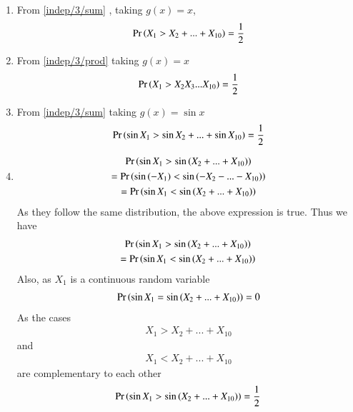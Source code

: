 \begin{enumerate}[label = (\Alph*)]
    \item 
    From \eqref{indep/3/sum} , taking $g(x)=x$,
    \begin{align}
        \Pr\left(X_1>X_2+...+X_{10}\right)=\frac{1}{2}
    \end{align}
\item
From \eqref{indep/3/prod} taking $g(x)=x$
        \begin{align}
         \Pr\left(X_1>X_2X_3...X_{10}\right)=\frac{1}{2}   
        \end{align}
\item 
From \eqref{indep/3/sum} taking $g(x)=\sin{x}$
        \begin{align}
         \Pr\left(\sin{X_1}>\sin{X_2}+...+\sin{X_{10}}\right)=\frac{1}{2}   
        \end{align}
\item \begin{multline}
        \Pr\left(\sin{X_1}>\sin{(X_2+...+X_{10})}\right)\\=\Pr\left(\sin{(-X_1)}<\sin{(-X_2-...-X_{10})}\right)\\
        =\Pr\left(\sin{X_1}<\sin{(X_2+...+X_{10})}\right)
    \end{multline}
    As they follow the same distribution, the above expression is true.
    Thus we have
    \begin{multline} 
    \Pr\left(\sin{X_1}>\sin{(X_2+...+X_{10}})\right)\\
        =\Pr\left(\sin{X_1}<\sin{(X_2+...+X_{10}})\right)    
    \end{multline}
    Also, as $X_1$ is a continuous random variable
    \begin{align}
       \Pr\left(\sin{X_1}=\sin{(X_2+...+X_{10})}\right)=0
    \end{align}
     As the cases
     \begin{align}
      {X_1>X_2+...+X_{10}}   
     \end{align}and 
     \begin{align}
         {X_1<X_2+...+X_{10}}
     \end{align}are complementary to each other 
        \begin{align}
         \Pr\left(\sin{X_1}>\sin{(X_2+...+X_{10}})\right)=\frac{1}{2}   
        \end{align}
\end{enumerate}